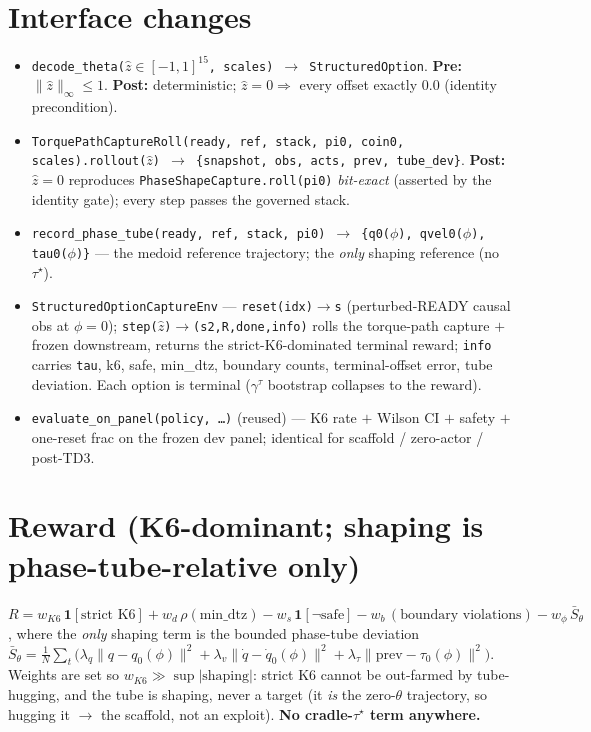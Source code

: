 \documentclass[11pt]{article}
\newcommand{\code}[1]{\texttt{\small #1}}
\begin{document}
\section{Interface changes}
\begin{itemize}[nosep,leftmargin=1.4em]
  \item \code{decode\_theta($\hat z\in[-1,1]^{15}$, scales) $\to$ StructuredOption}. \textbf{Pre:} $\lVert\hat z\rVert_\infty\le1$.
  \textbf{Post:} deterministic; $\hat z{=}0\Rightarrow$ every offset exactly $0.0$ (identity precondition).
  \item \code{TorquePathCaptureRoll(ready, ref, stack, pi0, coin0, scales).rollout($\hat z$) $\to$ \{snapshot, obs, acts,
  prev, tube\_dev\}}. \textbf{Post:} $\hat z{=}0$ reproduces \code{PhaseShapeCapture.roll(pi0)} \emph{bit-exact} (asserted by
  the identity gate); every step passes the governed stack.
  \item \code{record\_phase\_tube(ready, ref, stack, pi0) $\to$ \{q0($\phi$), qvel0($\phi$), tau0($\phi$)\}} --- the medoid
  reference trajectory; the \emph{only} shaping reference (no $\tau^\star$).
  \item \code{StructuredOptionCaptureEnv} --- \code{reset(idx)$\to$s} (perturbed-READY causal obs at $\phi{=}0$);
  \code{step($\hat z$)$\to$(s2,R,done,info)} rolls the torque-path capture $+$ frozen downstream, returns the
  strict-K6-dominated terminal reward; \code{info} carries \code{tau}, k6, safe, min\_dtz, boundary counts,
  terminal-offset error, tube deviation. Each option is terminal ($\gamma^\tau$ bootstrap collapses to the reward).
  \item \code{evaluate\_on\_panel(policy, \dots)} (reused) --- K6 rate $+$ Wilson CI $+$ safety $+$ one-reset frac on the
  frozen dev panel; identical for scaffold / zero-actor / post-TD3.
\end{itemize}

\section{Reward (K6-dominant; shaping is phase-tube-relative only)}
$R=w_{K6}\,\mathbf{1}[\text{strict K6}] + w_{d}\,\rho(\text{min\_dtz}) - w_{s}\,\mathbf{1}[\lnot\text{safe}]
- w_{b}\,(\text{boundary violations}) - w_{\phi}\,\bar S_\theta$, where the \emph{only} shaping term is the bounded
phase-tube deviation $\bar S_\theta=\frac1N\sum_t \big(\lambda_q\lVert q-q_0(\phi)\rVert^2 + \lambda_v\lVert\dot q-\dot
q_0(\phi)\rVert^2 + \lambda_\tau\lVert\text{prev}-\tau_0(\phi)\rVert^2\big)$. Weights are set so
$w_{K6}\gg\sup|\text{shaping}|$: strict K6 cannot be out-farmed by tube-hugging, and the tube is shaping, never a target
(it \emph{is} the zero-$\theta$ trajectory, so hugging it $\to$ the scaffold, not an exploit). \textbf{No cradle-$\tau^\star$
term anywhere.}
\end{document}

